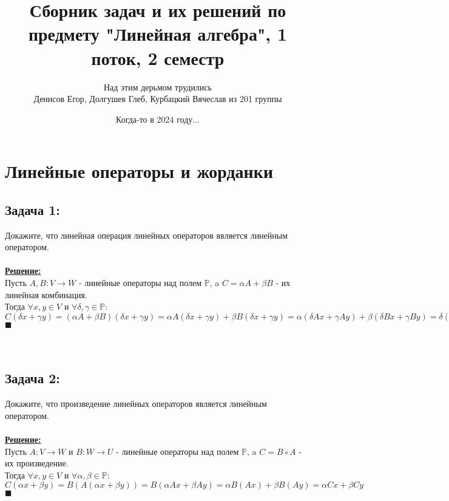 \documentclass[a4paper,12pt,titlepage,final]{article}
\title{Сборник задач и их решений по предмету "Линейная алгебра", 1 поток, 2 семестр}
\author{ Над этим дерьмом трудились\\Денисов Егор, Долгушев Глеб, Курбацкий Вячеслав из 201 группы}
\date{Когда-то в 2024 году...}
\begin{document}
\maketitle

\newpage
\tableofcontents

\newpage
\section*{Линейные операторы и жорданки}

\subsection*{Задача 1:}
\noindent Докажите, что линейная операция линейных операторов является линейным оператором. \\ \\
\textbf{\underline{Решение:}} \\
Пусть $A, B: V \rightarrow W$ - линейные операторы над полем $\mathbb{P}$, a $C = \alpha A + \beta B$ - их линейная комбинация.\\
Тогда $\forall x, y \in V$ и $\forall \delta, \gamma \in \mathbb{P}$:
$C(\delta x + \gamma y) = (\alpha A + \beta B) (\delta x + \gamma y) = \alpha A(\delta x + \gamma y) + \beta B(\delta x + \gamma y) =
\alpha (\delta Ax + \gamma Ay) + \beta (\delta Bx + \gamma By) = \delta (\alpha Ax + \beta Bx) + \gamma (\alpha Ay + \beta By) =
\delta (\alpha A + \beta B)x + \gamma (\alpha A + \beta B)y = \delta Cx + \gamma Cy$ \\ $\blacksquare$ \\ \\ \\

\subsection*{Задача 2:}
\noindent Докажите, что произведение линейных операторов является линейным оператором. \\ \\
\textbf{\underline{Решение:}} \\
Пусть $A: V \rightarrow W$ и $B: W \rightarrow U$ - линейные операторы над полем $\mathbb{P}$, a $C = B \circ A$ - их произведение.\\
Тогда $\forall x, y \in V$ и $\forall \alpha, \beta \in \mathbb{P}$:
$C(\alpha x + \beta y) = B(A(\alpha x + \beta y)) = B(\alpha Ax + \beta Ay) = \alpha B(Ax) + \beta B(Ay) = \alpha Cx + \beta Cy$ \\ $\blacksquare$ \\ \\ \\
\end{document}
